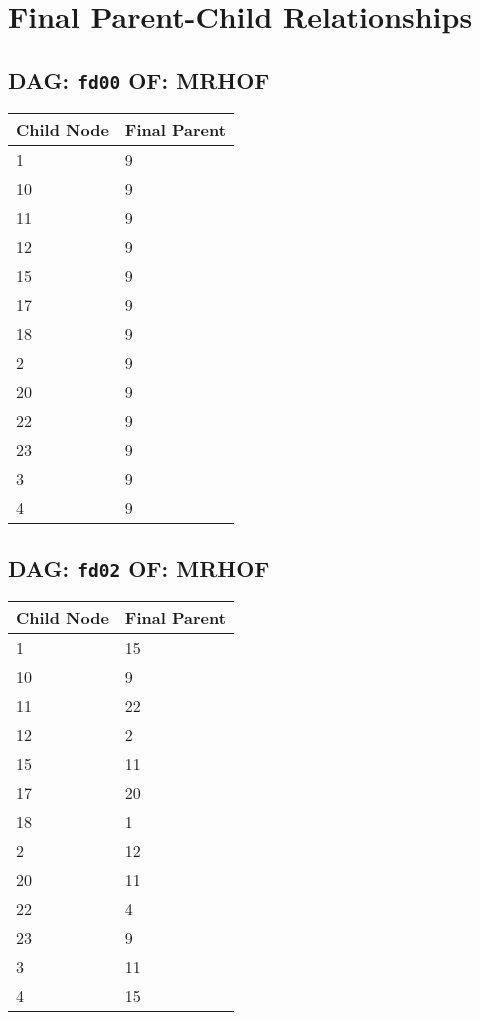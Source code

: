 \documentclass{article}
\begin{document}
\pagestyle{fancy}
\fancyhf{}
\section*{Final Parent-Child Relationships}
\subsection*{DAG: \texttt{fd00} OF: MRHOF}
\begin{tabular}{ll}
\toprule
\textbf{Child Node} & \textbf{Final Parent} \\
\midrule
1 & 9 \\
10 & 9 \\
11 & 9 \\
12 & 9 \\
15 & 9 \\
17 & 9 \\
18 & 9 \\
2 & 9 \\
20 & 9 \\
22 & 9 \\
23 & 9 \\
3 & 9 \\
4 & 9 \\
\bottomrule
\end{tabular}

\subsection*{DAG: \texttt{fd02} OF: MRHOF}
\begin{tabular}{ll}
\toprule
\textbf{Child Node} & \textbf{Final Parent} \\
\midrule
1 & 15 \\
10 & 9 \\
11 & 22 \\
12 & 2 \\
15 & 11 \\
17 & 20 \\
18 & 1 \\
2 & 12 \\
20 & 11 \\
22 & 4 \\
23 & 9 \\
3 & 11 \\
4 & 15 \\
\bottomrule
\end{tabular}
\end{document}
